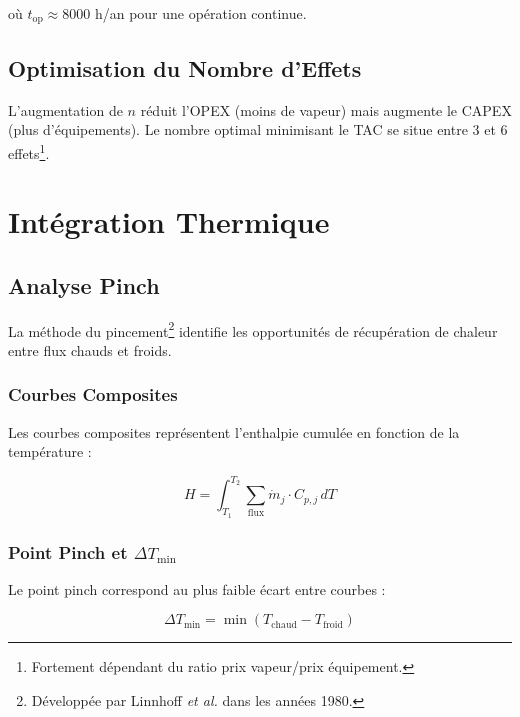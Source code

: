 \documentclass[12pt,a4paper,twoside]{article}
\begin{document}
où $t_{\text{op}} \approx 8000$ h/an pour une opération continue.

\subsection{Optimisation du Nombre d'Effets}

L'augmentation de $n$ réduit l'OPEX (moins de vapeur) mais augmente le CAPEX (plus d'équipements). Le nombre optimal minimisant le TAC se situe entre 3 et 6 effets\footnote{Fortement dépendant du ratio prix vapeur/prix équipement.}.

\section{Intégration Thermique}

\subsection{Analyse Pinch}

La méthode du pincement\footnote{Développée par Linnhoff \textit{et al.} dans les années 1980.} identifie les opportunités de récupération de chaleur entre flux chauds et froids.

\subsubsection{Courbes Composites}

Les courbes composites représentent l'enthalpie cumulée en fonction de la température :

\begin{equation}
H = \int_{T_1}^{T_2} \sum_{\text{flux}} \dot{m}_j \cdot C_{p,j} \, dT
\end{equation}

\subsubsection{Point Pinch et $\Delta T_{\min}$}

Le point pinch correspond au plus faible écart entre courbes :

\begin{equation}
\Delta T_{\min} = \min(T_{\text{chaud}} - T_{\text{froid}})
\end{equation}
\end{document}
